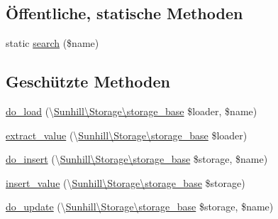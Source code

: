 \subsection*{Öffentliche, statische Methoden}
\begin{DoxyCompactItemize}
\item 
static \hyperlink{classSunhill_1_1Properties_1_1oo__property__attribute_ac0e3cc0b55d2738889a2ea4959072f1e}{search} (\$name)
\end{DoxyCompactItemize}
\subsection*{Geschützte Methoden}
\begin{DoxyCompactItemize}
\item 
\hyperlink{classSunhill_1_1Properties_1_1oo__property__attribute_a3e05923e8f9171050654d19491641adc}{do\+\_\+load} (\textbackslash{}\hyperlink{classSunhill_1_1Storage_1_1storage__base}{Sunhill\textbackslash{}\+Storage\textbackslash{}storage\+\_\+base} \$loader, \$name)
\item 
\hyperlink{classSunhill_1_1Properties_1_1oo__property__attribute_a14fada4d5f16e5eccdc6a93c08b88094}{extract\+\_\+value} (\textbackslash{}\hyperlink{classSunhill_1_1Storage_1_1storage__base}{Sunhill\textbackslash{}\+Storage\textbackslash{}storage\+\_\+base} \$loader)
\item 
\hyperlink{classSunhill_1_1Properties_1_1oo__property__attribute_acf69cc9429a5adf7100344902dd51b62}{do\+\_\+insert} (\textbackslash{}\hyperlink{classSunhill_1_1Storage_1_1storage__base}{Sunhill\textbackslash{}\+Storage\textbackslash{}storage\+\_\+base} \$storage, \$name)
\item 
\hyperlink{classSunhill_1_1Properties_1_1oo__property__attribute_a390cd5d64f1ec018a7ff862802ed5c2f}{insert\+\_\+value} (\textbackslash{}\hyperlink{classSunhill_1_1Storage_1_1storage__base}{Sunhill\textbackslash{}\+Storage\textbackslash{}storage\+\_\+base} \$storage)
\item 
\hyperlink{classSunhill_1_1Properties_1_1oo__property__attribute_ae80db5d531b7f9d2c43f3d20f56440f2}{do\+\_\+update} (\textbackslash{}\hyperlink{classSunhill_1_1Storage_1_1storage__base}{Sunhill\textbackslash{}\+Storage\textbackslash{}storage\+\_\+base} \$storage, \$name)
\end{DoxyCompactItemize}

